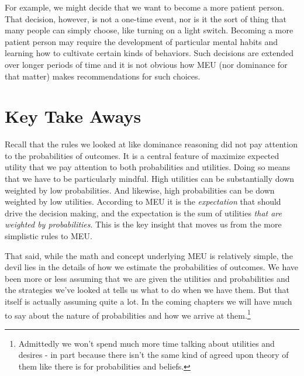 \documentclass[]{tufte-book}
\begin{document}
For example, we might decide that we want to become a more patient person. That decision, however, is not a one-time event, nor is it the sort of thing that many people can simply choose, like turning on a light switch. Becoming a more patient person may require the development of particular mental habits and learning how to cultivate certain kinds of behaviors. Such decisions are extended over longer periods of time and it is not obvious how MEU (nor dominance for that matter) makes recommendations for such choices.

\hypertarget{key-take-aways}{%
\section{Key Take Aways}\label{key-take-aways}}

Recall that the rules we looked at like dominance reasoning did not pay attention to the probabilities of outcomes. It is a central feature of maximize expected utility that we pay attention to both probabilities and utilities. Doing so means that we have to be particularly mindful. High utilities can be substantially down weighted by low probabilities. And likewise, high probabilities can be down weighted by low utilities. According to MEU it is the \emph{expectation} that should drive the decision making, and the expectation is the sum of utilities \emph{that are weighted by probabilities}. This is the key insight that moves us from the more simplistic rules to MEU.

That said, while the math and concept underlying MEU is relatively simple, the devil lies in the details of how we estimate the probabilities of outcomes. We have been more or less assuming that we are given the utilities and probabilities and the strategies we've looked at tells us what to do when we have them. But that itself is actually assuming quite a lot. In the coming chapters we will have much to say about the nature of probabilities and how we arrive at them.\footnote{Admittedly we won't spend much more time talking about utilities and desires - in part because there isn't the same kind of agreed upon theory of them like there is for probabilities and beliefs.}
\end{document}
